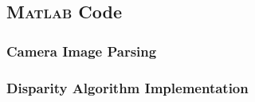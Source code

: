 \subsection{\textsc{Matlab} Code}
\subsubsection{Camera Image Parsing} \label{camTestMatlab}
\singlespacing

\doublespacing
\subsubsection{Disparity Algorithm Implementation} \label{disparityTestMatlab}
\singlespacing

\doublespacing